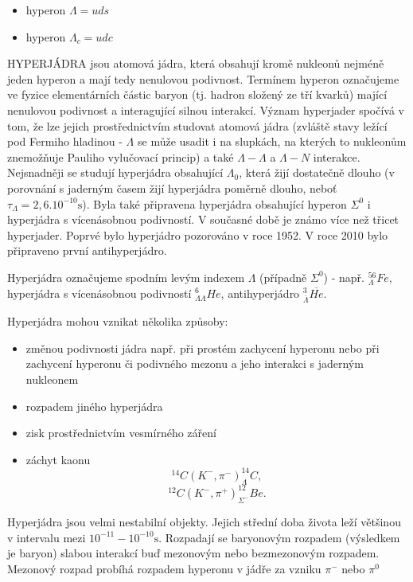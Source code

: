 \documentclass[../../main.tex]{subfiles}
\begin{document}
\begin{itemize}
	\item hyperon $\Lambda = uds$
	\item hyperon $\Lambda_c = udc$ 
\end{itemize}

HYPERJÁDRA jsou atomová jádra, která obsahují kromě nukleonů nejméně jeden hyperon a mají tedy nenulovou podivnost. Termínem hyperon označujeme ve fyzice elementárních částic baryon (tj. hadron složený ze tří kvarků) mající nenulovou podivnost a interagující silnou interakcí. Význam hyperjader spočívá v tom, že lze jejich prostřednictvím studovat atomová jádra (zvláště stavy ležící pod Fermiho hladinou - $ \Lambda $ se může usadit i na slupkách, na kterých to nukleonům znemožňuje Pauliho vylučovací princip) a také $ \Lambda - \Lambda $ a $\Lambda - N$ interakce. Nejsnadněji se studují hyperjádra obsahující $\Lambda _0$, která žijí dostatečně dlouho (v porovnání s jaderným časem žijí hyperjádra poměrně dlouho, neboť $\tau _ \Lambda = 2,6.10^{-10} \mathrm{s}$). Byla také připravena hyperjádra obsahující hyperon $ \Sigma ^0 $ i hyperjádra s vícenásobnou podivností. V současné době je známo více než třicet hyperjader. Poprvé bylo hyperjádro pozorováno v roce 1952. V roce 2010 bylo připraveno první antihyperjádro. 

Hyperjádra označujeme spodním levým indexem $ \Lambda $ (případně $ \Sigma ^0 $) - např. $^{56}_{\Lambda}Fe$, hyperjádra s vícenásobnou podivností $^{6}_{\Lambda \Lambda}He$, antihyperjádro $^{3}_{\overline{ \Lambda }}\overline{He}$.

Hyperjádra mohou vznikat několika způsoby:
\begin{itemize}
	\item změnou podivnosti jádra např. při prostém zachycení hyperonu nebo při zachycení hyperonu či podivného mezonu a jeho interakci s jaderným nukleonem
	\item rozpadem jiného hyperjádra
	\item zisk prostřednictvím vesmírného záření
	\item záchyt kaonu 
	\begin{equation}
	^{14} C (K^-, \pi ^-)  ^{14}_{\Lambda}C,
	\end{equation}
	\begin{equation}
     ^{12} C (K^-, \pi ^+)  ^{12}_{\Sigma ^-}Be.
	\end{equation}
\end{itemize}

Hyperjádra jsou velmi nestabilní objekty. Jejich střední doba života leží většinou v intervalu mezi $10^{-11} - 10^{-10} \mathrm{s}$. Rozpadají se baryonovým rozpadem (výsledkem je baryon) slabou interakcí buď mezonovým nebo bezmezonovým rozpadem. Mezonový rozpad probíhá rozpadem hyperonu v jádře za vzniku $\pi ^-$ nebo $\pi ^0$ 
\end{document}
